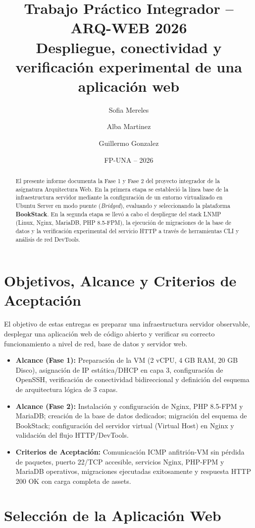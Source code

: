 \documentclass[12pt,a4paper]{article}
\title{\textbf{Trabajo Práctico Integrador -- ARQ-WEB 2026}\\Despliegue, conectividad y verificación experimental de una aplicación web}
\author{Sofia Mereles \and Alba Martinez \and Guillermo Gonzalez}
\date{FP-UNA -- 2026}
\begin{document}
\maketitle

\begin{abstract}
El presente informe documenta la Fase 1 y Fase 2 del proyecto integrador de la asignatura Arquitectura Web. En la primera etapa se estableció la línea base de la infraestructura servidor mediante la configuración de un entorno virtualizado en Ubuntu Server en modo puente (\textit{Bridged}), evaluando y seleccionando la plataforma \textbf{BookStack}. En la segunda etapa se llevó a cabo el despliegue del stack LNMP (Linux, Nginx, MariaDB, PHP 8.5-FPM), la ejecución de migraciones de la base de datos y la verificación experimental del servicio HTTP a través de herramientas CLI y análisis de red DevTools.
\end{abstract}

\tableofcontents
\newpage

\section{Objetivos, Alcance y Criterios de Aceptación}
El objetivo de estas entregas es preparar una infraestructura servidor observable, desplegar una aplicación web de código abierto y verificar su correcto funcionamiento a nivel de red, base de datos y servidor web.

\begin{itemize}
    \item \textbf{Alcance (Fase 1):} Preparación de la VM (2 vCPU, 4 GB RAM, 20 GB Disco), asignación de IP estática/DHCP en capa 3, configuración de OpenSSH, verificación de conectividad bidireccional y definición del esquema de arquitectura lógica de 3 capas.
    \item \textbf{Alcance (Fase 2):} Instalación y configuración de Nginx, PHP 8.5-FPM y MariaDB; creación de la base de datos dedicados; migración del esquema de BookStack; configuración del servidor virtual (Virtual Host) en Nginx y validación del flujo HTTP/DevTools.
    \item \textbf{Criterios de Aceptación:} Comunicación ICMP anfitrión-VM sin pérdida de paquetes, puerto 22/TCP accesible, servicios Nginx, PHP-FPM y MariaDB operativos, migraciones ejecutadas exitosamente y respuesta HTTP 200 OK con carga completa de assets.
\end{itemize}

\section{Selección de la Aplicación Web}
\end{document}
